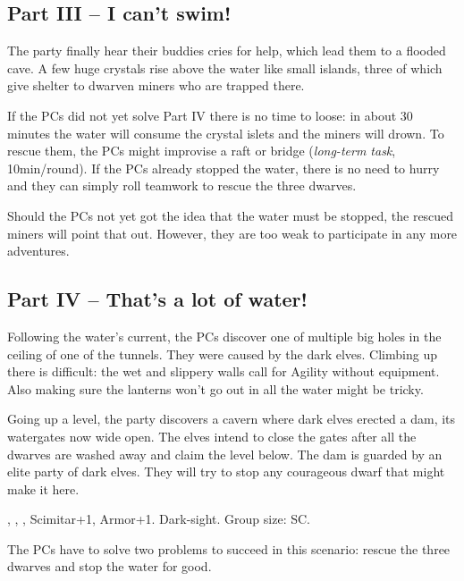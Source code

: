 {		\subsection{Part III -- I can't swim!}

		The party finally hear their buddies cries for help, which lead them to a flooded cave. A few huge crystals rise above the water like small islands, three of which give shelter to dwarven miners who are trapped there.

		If the PCs did not yet solve Part IV there is no time to loose: in about 30 minutes the water will consume the crystal islets and the miners will drown. To rescue them, the PCs might improvise a raft or bridge (\emph{long-term task}, 10min/round). If the PCs already stopped the water, there is no need to hurry and they can simply roll teamwork to rescue the three dwarves.

		Should the PCs not yet got the idea that the water must be stopped, the rescued miners will point that out. However, they are too weak to participate in any more adventures.

		\subsection{Part IV -- That's a lot of water!}

		Following the water's current, the PCs discover one of multiple big holes in the ceiling of one of the tunnels. They were caused by the dark elves. Climbing up there is difficult: the wet and slippery walls call for Agility without equipment. Also making sure the lanterns won't go out in all the water might be tricky.

		Going up a level, the party discovers a cavern where dark elves erected a dam, its watergates now wide open. The elves intend to close the gates after all the dwarves are washed away and claim the level below. The dam is guarded by an elite party of dark elves. They will try to stop any courageous dwarf that might make it here.

		 , , , Scimitar+1, Armor+1. Dark-sight. Group size: SC.


		\noindent
		The PCs have to solve two problems to succeed in this scenario: rescue the three dwarves and stop the water for good.
}
